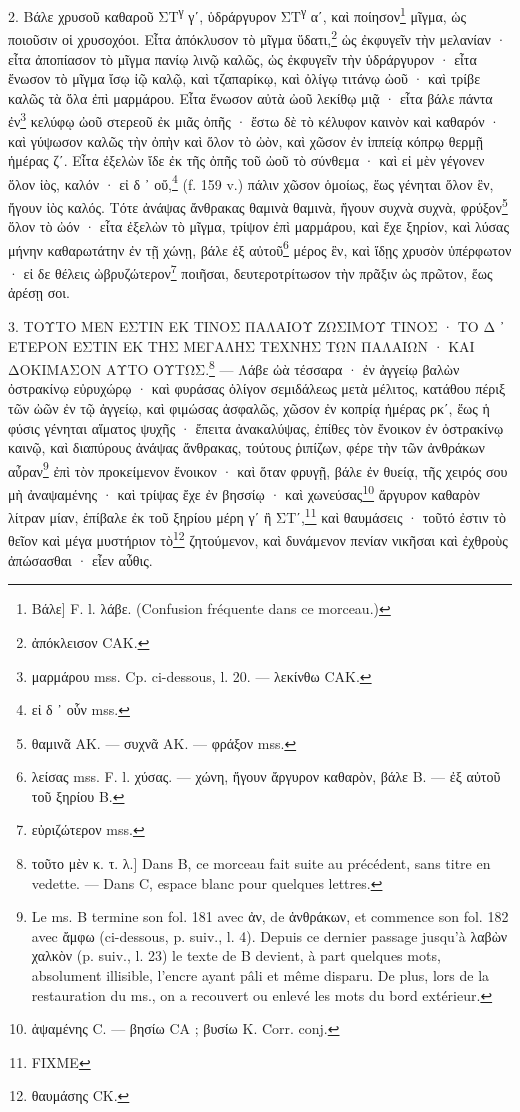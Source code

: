 \documentclass[a4paper, 11pt, oneside, polutonikogreek, french]{article}
\begin{document}
2. Βάλε χρυσοῦ καθαροῦ ΣΤ\textsuperscript{γ} γʹ, ὑδράργυρον ΣΤ\textsuperscript{γ} αʹ, καὶ ποίησον\footnote{Bάλε] F. l. λάβε. (Confusion fréquente dans ce morceau.)} μῖγμα, ὡς ποιοῦσιν οἱ χρυσοχόοι. Εἶτα ἀπόκλυσον τὸ μῖγμα ὕδατι,\footnote{ἀπόκλεισον CAK.} ὡς ἐκφυγεῖν τὴν μελανίαν · εἶτα ἀποπίασον τὸ μῖγμα πανίῳ λινῷ καλῶς, ὡς ἐκφυγεῖν τὴν ὑδράργυρον · εἶτα ἕνωσον τὸ μῖγμα ἴσῳ ἰῷ καλῷ, καὶ τζαπαρίκῳ, καὶ ὀλίγῳ τιτάνῳ ὠοῦ · καὶ τρίβε καλῶς τὰ ὅλα ἐπὶ μαρμάρου. Εἶτα ἕνωσον αὐτὰ ὠοῦ λεκίθῳ μιᾷ · εἶτα βάλε πάντα ἐν\footnote{μαρμάρου mss. Cp. ci-dessous, l. 20. --- λεκίνθω CAK.} κελύφῳ ὠοῦ στερεοῦ ἐκ μιᾶς ὀπῆς · ἔστω δὲ τὸ κέλυφον καινὸν καὶ καθαρόν · καὶ γύψωσον καλῶς τὴν ὀπὴν καὶ ὅλον τὸ ὠὸν, καὶ χῶσον ἐν ἱππείᾳ κόπρῳ θερμῇ ἡμέρας ζʹ. Εἶτα ἐξελὼν ἴδε ἐκ τῆς ὀπῆς τοῦ ὠοῦ τὸ σύνθεμα · καὶ εἰ μὲν γέγονεν ὅλον ἰὸς, καλόν · εἰ δ ᾽ οὔ,\footnote{εἰ δ ᾽ οὗν mss.} (f. 159 v.) πάλιν χῶσον ὁμοίως, ἕως γένηται ὅλον ἓν, ἤγουν ἰὸς καλός. Τότε ἀνάψας ἄνθρακας θαμινὰ θαμινὰ, ἤγουν συχνὰ συχνὰ, φρύξον\footnote{θαμινᾶ AK. --- συχνᾶ AK. --- φράξον mss.} ὅλον τὸ ὠόν · εἶτα ἐξελὼν τὸ μῖγμα, τρίψον ἐπὶ μαρμάρου, καὶ ἔχε ξηρίον, καὶ λύσας μήνην καθαρωτάτην ἐν τῇ χώνῃ, βάλε ἐξ αὐτοῦ\footnote{λείσας mss. F. l. χύσας. --- χώνη, ἤγουν ἄργυρον καθαρὸν, βάλε B. --- ἐξ αὐτοῦ τοῦ ξηρίου B.} μέρος ἓν, καὶ ἴδῃς χρυσὸν ὑπέρφωτον · εἰ δε θέλεις ὠβρυζώτερον\footnote{εὐριζώτερον mss.} ποιῆσαι, δευτεροτρίτωσον τὴν πρᾶξιν ὡς πρῶτον, ἕως ἀρέσῃ σοι.

3. ΤΟΥΤΟ ΜΕΝ ΕΣΤΙΝ ΕΚ ΤΙΝΟΣ ΠΑΛΑΙΟΥ ΖΩΣΙΜΟΥ ΤΙΝΟΣ · ΤΟ Δ ᾽ ΕΤΕΡΟΝ ΕΣΤΙΝ ΕΚ ΤΗΣ ΜΕΓΑΛΗΣ ΤΕΧΝΗΣ ΤΩΝ ΠΑΛΑΙΩΝ · ΚΑΙ ΔΟΚΙΜΑΣΟΝ ΑΥΤΟ ΟΥΤΩΣ.\footnote{τοῦτο μὲν κ. τ. λ.] Dans B, ce morceau fait suite au précédent, sans titre en vedette. --- Dans C, espace blanc pour quelques lettres.} --- Λάβε ὠὰ τέσσαρα · ἐν ἀγγείῳ βαλὼν ὀστρακίνῳ εὐρυχώρῳ · καὶ φυράσας ὀλίγον σεμιδάλεως μετὰ μέλιτος, κατάθου πέριξ τῶν ὠῶν ἐν τῷ ἀγγείῳ, καὶ φιμώσας ἀσφαλῶς, χῶσον ἐν κοπρίᾳ ἡμέρας ρκʹ, ἕως ἡ φύσις γένηται αἵματος ψυχῆς · ἔπειτα ἀνακαλύψας, ἐπίθες τὸν ἔνοικον ἐν ὀστρακίνῳ καινῷ, καὶ διαπύρους ἀνάψας ἄνθρακας, τούτους ῥιπίζων, φέρε τὴν τῶν ἀνθράκων αὖραν\footnote{Le ms. B termine son fol. 181 avec ἀν, de ἀνθράκων, et commence son fol. 182 avec ἄμφω (ci-dessous, p. suiv., l. 4). Depuis ce dernier passage jusqu'à λαβὼν χαλκὸν (p. suiv., l. 23) le texte de B devient, à part quelques mots, absolument illisible, l'encre ayant pâli et même disparu. De plus, lors de la restauration du ms., on a recouvert ou enlevé les mots du bord extérieur.} ἐπὶ τὸν προκείμενον ἔνοικον · καὶ ὅταν φρυγῇ, βάλε ἐν θυείᾳ, τῆς χειρός σου μὴ ἀναψαμένης · καὶ τρίψας ἔχε ἐν βησσίῳ · καὶ χωνεύσας\footnote{ἁψαμένης C. --- βησίω CA ; βυσίω K. Corr. conj.} ἄργυρον καθαρὸν λίτραν μίαν, ἐπίβαλε ἐκ τοῦ ξηρίου μέρη γʹ ἢ ΣΤʹ,\footnote{FIXME} καὶ θαυμάσεις · τοῦτό ἐστιν τὸ θεῖον καὶ μέγα μυστήριον τὸ\footnote{θαυμάσης CK.} ζητούμενον, καὶ δυνάμενον πενίαν νικῆσαι καὶ ἐχθροὺς ἀπώσασθαι · εἶεν αὖθις.
\end{document}
